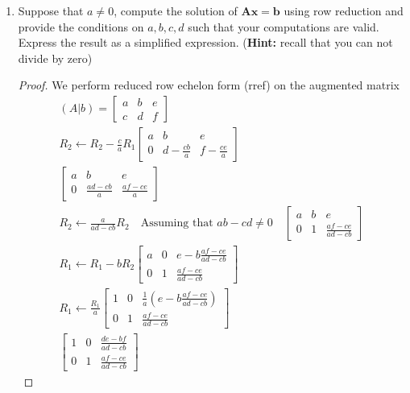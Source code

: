 \documentclass[11pt]{scrartcl}
\begin{document}
\begin{enumerate}[label=\alph*.]
	\item{
	      Suppose that $a\neq 0 $, compute the solution of $\mathbf{Ax = b}$
	      using row reduction and provide the conditions on $a,b,c,d$ such that your computations are valid.
	      Express the result as a simplified expression. (\textbf{Hint:} recall that you can not divide by zero)
	      \begin{proof}
		      We perform reduced row echelon form (rref) on the augmented matrix
		      \begin{align*}
			      (A|b)=
			      \left[\begin{array}{cc|c}
					      a & b & e \\
					      c & d & f
				      \end{array}\right] \\
			      R_2 \leftarrow R_2 - \frac{c}{a} R_1
			      \left[\begin{array}{cc|c}
					      a & b                & e                \\
					      0 & d - \frac{cb}{a} & f - \frac{ce}{a}
				      \end{array}\right] \\
			      \left[\begin{array}{cc|c}
					      a & b               & e               \\
					      0 & \frac{ad-cb}{a} & \frac{af-ce}{a}
				      \end{array}\right] \\
			      R_2 \leftarrow \frac{a}{ad-cb}R_2 \quad \text{Assuming that $ab-cd \neq 0$} \quad
			      \left[\begin{array}{cc|c}
					      a & b & e                   \\
					      0 & 1 & \frac{af-ce}{ad-cb}
				      \end{array}\right] \\
			      R_1 \leftarrow R_1 - bR_2
			      \left[\begin{array}{cc|c}
					      a & 0 & e -b \frac{af-ce}{ad-cb} \\
					      0 & 1 & \frac{af-ce}{ad-cb}
				      \end{array}\right] \\
			      R_1 \leftarrow \frac{R_1}{a}
			      \left[\begin{array}{cc|c}
					      1 & 0 & \frac{1}{a}(e -b \frac{af-ce}{ad-cb}) \\
					      0 & 1 & \frac{af-ce}{ad-cb}
				      \end{array}\right] \\
			      \left[\begin{array}{cc|c}
					      1 & 0 & \frac{de-bf}{ad-cb} \\
					      0 & 1 & \frac{af-ce}{ad-cb}
				      \end{array}\right]
		      \end{align*}


\end{proof}}
\end{enumerate}
\end{document}
